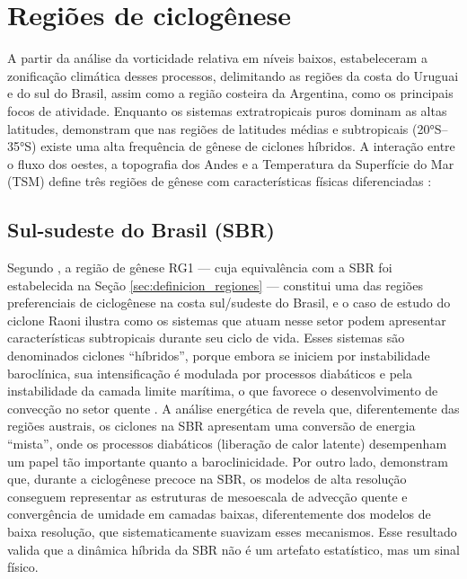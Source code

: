 
\section{Regiões de ciclogênese}\label{sec:tb_regiones}

A partir da análise da vorticidade relativa em níveis baixos, \citet{reboita2010south} estabeleceram a zonificação climática desses processos, delimitando as regiões da costa do Uruguai e do sul do Brasil, assim como a região costeira da Argentina, como os principais focos de atividade. Enquanto os sistemas extratropicais puros dominam as altas latitudes, \citet{gozzo2014subtropical} demonstram que nas regiões de latitudes médias e subtropicais (20°S--35°S) existe uma alta frequência de gênese de ciclones híbridos. A interação entre o fluxo dos oestes, a topografia dos Andes e a Temperatura da Superfície do Mar (TSM) define três regiões de gênese com características físicas diferenciadas \citep{gramcianinov2019properties}: 

\subsection{Sul-sudeste do Brasil (SBR)}\label{subsec:tb_sbr}

Segundo \citet{reboita2022from}, a região de gênese RG1 — cuja equivalência com a SBR foi estabelecida na Seção \ref{sec:definicion_regiones} — constitui uma das regiões preferenciais de ciclogênese na costa sul/sudeste do Brasil, e o caso de estudo do ciclone Raoni ilustra como os sistemas que atuam nesse setor podem apresentar características subtropicais durante seu ciclo de vida. Esses sistemas são denominados ciclones ``híbridos'', porque embora se iniciem por instabilidade baroclínica, sua intensificação é modulada por processos diabáticos e pela instabilidade da camada limite marítima, o que favorece o desenvolvimento de convecção no setor quente \citep{marrafon2022classificacao}. 
A análise energética de \citet{coutodesouza2024thesis} revela que, diferentemente das regiões austrais, os ciclones na SBR apresentam uma conversão de energia ``mista'', onde os processos diabáticos (liberação de calor latente) desempenham um papel tão importante quanto a baroclinicidade. Por outro lado, \citet{gramcianinov2024early} demonstram que, durante a ciclogênese precoce na SBR, os modelos de alta resolução conseguem representar as estruturas de mesoescala de advecção quente e convergência de umidade em camadas baixas, diferentemente dos modelos de baixa resolução, que sistematicamente suavizam esses mecanismos. Esse resultado valida que a dinâmica híbrida da SBR não é um artefato estatístico, mas um sinal físico.

